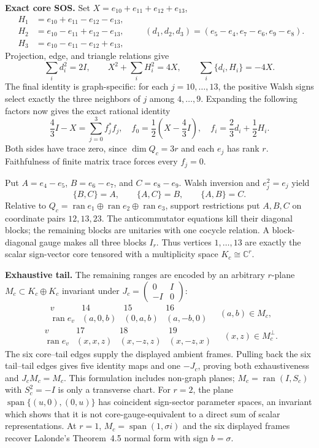 \documentclass[10pt]{article}
\begin{document}
\textbf{Exact core SOS.}
Set $X=e_{10}+e_{11}+e_{12}+e_{13}$,
\[
\begin{aligned}
H_1&=e_{10}+e_{11}-e_{12}-e_{13},\\
H_2&=e_{10}-e_{11}+e_{12}-e_{13},\\
H_3&=e_{10}-e_{11}-e_{12}+e_{13},
\end{aligned}
\qquad
(d_1,d_2,d_3)=(e_5-e_4,e_7-e_6,e_9-e_8).
\]
Projection, edge, and triangle relations give
\[
 \sum_i d_i^2=2I,\qquad X^2+\sum_iH_i^2=4X,
 \qquad\sum_i\{d_i,H_i\}=-4X.
\]
The final identity is graph-specific: for each $j=10,\ldots,13$, the
positive Walsh signs select exactly the three neighbors of $j$ among
$4,\ldots,9$.  Expanding the following factors now gives the exact rational
identity
\[
 \frac43I-X=\sum_{j=0}^3f_j^*f_j,
 \quad f_0=\frac12\left(X-\frac43I\right),
 \quad f_i=\frac23d_i+\frac12H_i.
\]
Both sides have trace zero, since $\dim Q_c=3r$ and each $e_j$ has rank $r$.
Faithfulness of finite matrix trace forces every $f_j=0$.

\newpage
Put $A=e_4-e_5$, $B=e_6-e_7$, and $C=e_8-e_9$.  Walsh inversion and
$e_j^2=e_j$ yield
\[
 \{B,C\}=A,\qquad\{A,C\}=B,\qquad\{A,B\}=C.
\]
Relative to $Q_c=\operatorname{ran}e_1\oplus\operatorname{ran}e_2
\oplus\operatorname{ran}e_3$, support restrictions put $A,B,C$ on coordinate
pairs $12,13,23$.  The anticommutator equations kill their diagonal blocks;
the remaining blocks are unitaries with one cocycle relation.  A
block-diagonal gauge makes all three blocks $I_r$.  Thus vertices
$1,\ldots,13$ are exactly the scalar sign-vector core tensored with a
multiplicity space $K_c\cong\mathbb C^r$.

\textbf{Exhaustive tail.}
The remaining ranges are encoded by an arbitrary $r$-plane
$M_c\subset K_c\oplus K_c$ invariant under
$J_c=\left(\begin{smallmatrix}0&I\\-I&0\end{smallmatrix}\right)$:
\[
\begin{array}{c|ccc}
v&14&15&16\\ \hline
\operatorname{ran}e_v&(a,0,b)&(0,a,b)&(a,-b,0)
\end{array}\quad (a,b)\in M_c,
\]
\[
\begin{array}{c|ccc}
v&17&18&19\\ \hline
\operatorname{ran}e_v&(x,x,z)&(x,-z,z)&(x,-z,x)
\end{array}\quad (x,z)\in M_c^\perp.
\]
The six core--tail edges supply the displayed ambient frames.  Pulling back
the six tail--tail edges gives five identity maps and one $-J_c$, proving
both exhaustiveness and $J_cM_c=M_c$.  This formulation includes non-graph
planes; $M_c=\operatorname{ran}(I,S_c)$ with $S_c^2=-I$ is only a transverse
chart.  For $r=2$, the plane
$\operatorname{span}\{(u,0),(0,u)\}$ has coincident sign-sector parameter
spaces, an invariant which shows that it is not core-gauge-equivalent to a
direct sum of scalar representations.
At $r=1$, $M_c=\operatorname{span}(1,\sigma i)$ and the six displayed frames
recover Lalonde's Theorem~4.5 normal form with sign $b=\sigma$.
\end{document}
